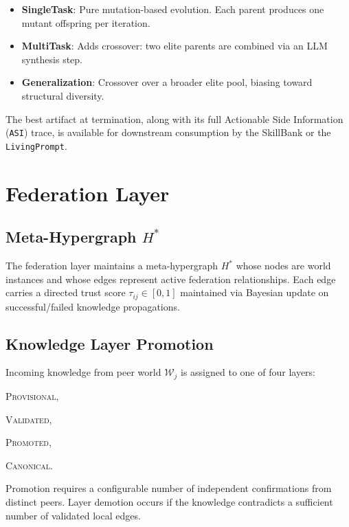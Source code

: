 \documentclass[11pt]{article}
\begin{document}
\begin{itemize}[noitemsep,topsep=4pt]
  \item \textbf{SingleTask}: Pure mutation-based evolution. Each parent produces
        one mutant offspring per iteration.
  \item \textbf{MultiTask}: Adds crossover: two elite parents are combined via
        an LLM synthesis step.
  \item \textbf{Generalization}: Crossover over a broader elite pool, biasing
        toward structural diversity.
\end{itemize}

The best artifact at termination, along with its full Actionable Side Information
(\texttt{ASI}) trace, is available for downstream consumption by the SkillBank or
the \texttt{LivingPrompt}.

\section{Federation Layer}
\nopagebreak[4]
\label{sec:federation}

\subsection[Meta-Hypergraph H*]{Meta-Hypergraph $H^*$}

The federation layer maintains a meta-hypergraph $H^*$ whose nodes are world
instances and whose edges represent active federation relationships. Each edge
carries a directed trust score $\tau_{ij} \in [0,1]$ maintained via Bayesian
update on successful/failed knowledge propagations.

\subsection{Knowledge Layer Promotion}

Incoming knowledge from peer world $\mathcal{W}_j$ is assigned to one of four
layers:
\begin{enumerate*}[label=(\roman*)]
  \item \textsc{Provisional},
  \item \textsc{Validated},
  \item \textsc{Promoted},
  \item \textsc{Canonical}.
\end{enumerate*}
Promotion requires a configurable number of independent confirmations from
distinct peers. Layer demotion occurs if the knowledge contradicts a sufficient
number of validated local edges.
\end{document}
